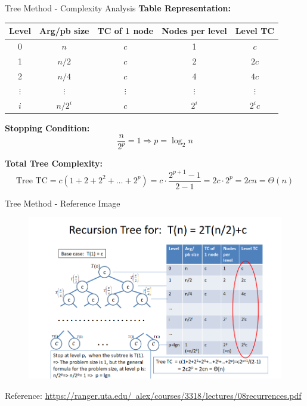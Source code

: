 \begin{frame}{Tree Method - Complexity Analysis}
    \textbf{Table Representation:}
    \begin{table}[]
        \centering
        \begin{tabular}{|c|c|c|c|c|}
            \hline
            \textbf{Level} & \textbf{Arg/pb size} & \textbf{TC of 1 node} & \textbf{Nodes per level} & \textbf{Level TC} \\
            \hline
            0 & \( n \) & \( c \) & 1 & \( c \) \\
            1 & \( n/2 \) & \( c \) & 2 & \( 2c \) \\
            2 & \( n/4 \) & \( c \) & 4 & \( 4c \) \\
            \(\vdots\) & \(\vdots\) & \(\vdots\) & \(\vdots\) & \(\vdots\) \\
            \( i \) & \( n/2^i \) & \( c \) & \( 2^i \) & \( 2^i c \) \\
            \hline
        \end{tabular}
    \end{table}

    \vspace{0.5cm}

    \textbf{Stopping Condition:}
    \[
    \frac{n}{2^p} = 1 \Rightarrow p = \log_2 n
    \]

    \vspace{0.5cm}

    \textbf{Total Tree Complexity:}
    \[
    \text{Tree TC} = c(1 + 2 + 2^2 + \dots + 2^p) = c \cdot \frac{2^{p+1} - 1}{2 - 1} = 2c \cdot 2^p = 2cn = \Theta(n)
    \]
\end{frame}

\begin{frame}{Tree Method - Reference Image}
 \begin{figure}
         \centering
         \includegraphics[width=0.8\linewidth]{treemethod.png}
         \label{fig:enter-label}
     \end{figure}    
     \small
    Reference: \href{https://ranger.uta.edu/~alex/courses/3318/lectures/08_recurrences.pdf}{https://ranger.uta.edu/~alex/courses/3318/lectures/08recurrences.pdf}
     
\end{frame}




